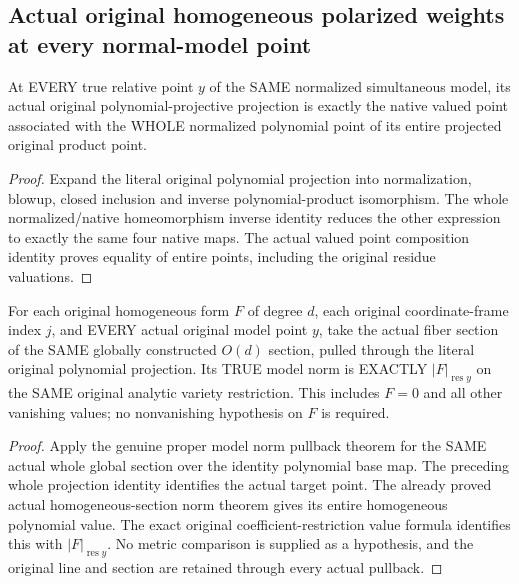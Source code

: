 \subsection{Actual original homogeneous polarized weights at every normal-model point}

\begin{lemma}
\label{local:actual-full-point-polynomial-projection}
\leanok
{}
At EVERY true relative point $y$ of the SAME normalized simultaneous
model, its actual original polynomial-projective projection is exactly
the native valued point associated with the WHOLE normalized polynomial
point of its entire projected original product point.
\end{lemma}
\begin{proof}
Expand the literal original polynomial projection into normalization,
blowup, closed inclusion and inverse polynomial-product isomorphism.
The whole normalized/native homeomorphism inverse identity reduces the
other expression to exactly the same four native maps. The actual valued
point composition identity proves equality of entire points, including
the original residue valuations.
\end{proof}

\begin{definition}
\label{local:actual-full-point-homogeneous-section-norm}
\leanok
{}
For each original homogeneous form $F$ of degree $d$, each original
coordinate-frame index $j$, and EVERY actual original model point $y$,
take the actual fiber section of the SAME globally constructed $O(d)$
section, pulled through the literal original polynomial projection.
Its TRUE model norm is EXACTLY $|F|_{\operatorname{res}y}$ on the SAME
original analytic variety restriction. This includes $F=0$ and all other
vanishing values; no nonvanishing hypothesis on $F$ is required.
\end{definition}
\begin{proof}
Apply the genuine proper model norm pullback theorem for the SAME actual
whole global section over the identity polynomial base map. The preceding
whole projection identity identifies the actual target point. The already
proved actual homogeneous-section norm theorem gives its entire
homogeneous polynomial value. The exact original coefficient-restriction
value formula identifies this with $|F|_{\operatorname{res}y}$. No metric
comparison is supplied as a hypothesis, and the original line and section
are retained through every actual pullback.
\end{proof}

